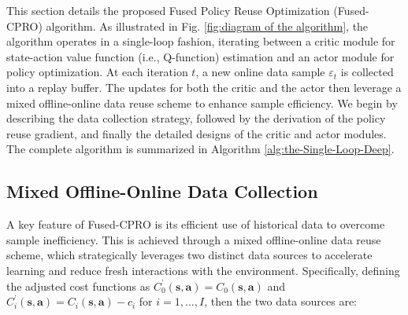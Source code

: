 \documentclass{IEEEtran}
\begin{document}
This section details the proposed Fused Policy Reuse Optimization (Fused-CPRO) algorithm. As illustrated in Fig. \ref{fig:diagram of the algorithm}, the algorithm operates in a single-loop fashion, iterating between a critic module for state-action value function (i.e., Q-function) estimation and an actor module for policy optimization. At each iteration $t$, a new online data sample $\varepsilon_{t}$ is collected into a replay buffer. The updates for both the critic and the actor then leverage a mixed offline-online data reuse scheme to enhance sample efficiency. We begin by describing the data collection strategy, followed by the derivation of the policy reuse gradient, and finally the detailed designs of the critic and actor modules. The complete algorithm is summarized in Algorithm \ref{alg:the-Single-Loop-Deep}.

\subsection{Mixed Offline-Online Data Collection}
A key feature of Fused-CPRO is its efficient use of historical data to overcome sample inefficiency. This is achieved through a mixed offline-online data reuse scheme, which strategically leverages two distinct data sources to accelerate learning and reduce fresh interactions with the environment. Specifically, defining the adjusted cost functions as $C_{0}^{\text{'}}(\boldsymbol{s},\boldsymbol{a})=C_{0}(\boldsymbol{s},\boldsymbol{a})$ and $C_{i}^{\text{'}}(\boldsymbol{s},\boldsymbol{a})=C_{i}(\boldsymbol{s},\boldsymbol{a})-c_{i}$ for $i=1,\ldots,I$, then the two data sources are:
\end{document}
